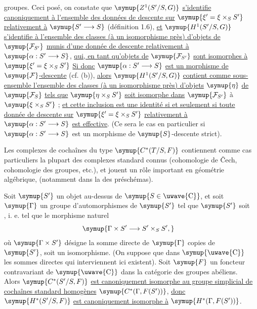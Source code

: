 groupes. Ceci posé, on constate que $\symup{Z^1(S'/S,G)}$ \uline{s'identifie
canoniquement à l'ensemble des données de descente sur}
$\symup{\xi'=\xi\times_SS'}$ \uline{relativement à} $\symup{S'\longrightarrow S}$ (définition 1.6),
\uline{et} $\symup{H^1(S'/S,G)}$ \uline{s'identifie à l'ensemble des classes (à un
isomorphisme près) d'objets de} $\symup{\mathcal F_{S'}}$ \uline{munis d'une donnée de descente
relativement à} $\symup{\alpha:S'\longrightarrow S}$, \uline{qui, en tant qu'objets de}
$\symup{\mathcal F_{S'}}$ \uline{sont isomorphes à} $\symup{\xi'=\xi\times_SS'}$ \uline{Si donc} $\symup{\alpha:S'\longrightarrow S}$ \uline{est un morphisme de} $\symup{\mathcal F}$\uline{-descente} (cf. (b)), \uline{alors} $\symup{H^1(S'/S,G)}$ \uline{contient comme sous-ensemble
l'ensemble des classes (à un isomorphisme près) d'objets} $\symup{\eta}$ \uline{de}
$\symup{\mathcal F_S}$ \uline{tels que} $\symup{\eta\times_SS'}$ \uline{soit isomorphe dans}
$\symup{\mathcal F_{S'}}$ à $\symup{\xi\times_SS'}$ ; \uline{et cette inclusion est une identité si
et seulement si toute donnée de descente sur} $\symup{\xi'=\xi\times_SS'}$
\uline{relativement à} $\symup{\alpha:S'\longrightarrow S}$ \uline{est effective}. (Ce sera le cas en
particulier si $\symup{\alpha:S'\longrightarrow S}$ est un morphisme de
$\symup{S}$-descente strict).

 Les complexes de cochaînes du type $\symup{C^*(T/S,F)}$ contiennent
comme cas particuliers la plupart des complexes standard connus (cohomologie
de Čech, cohomologie des groupes, etc.), et jouent un rôle important en
géométrie algébrique, (notamment dans la  des préschémas).

 Soit $\symup{S'}$ un objet au-dessus de $\symup{S\in\text{\uwave{C}}}$, et
soit $\symup{\Gamma}$ un groupe d'automorphismes de $\symup{S'}$ tel que $\symup{S'}$ soit
, i. e. tel que le
morphisme naturel
\[
  \symup{\Gamma\times S'\longrightarrow S'\times_SS',}
\]
où $\symup{\Gamma\times S'}$ désigne la somme directe de $\symup{\Gamma}$ copies de $\symup{S'}$, soit
un isomorphisme. (On suppose que dans $\symup{\text{\uwave{C}}}$ les sommes directes qui
interviennent ici existent). Soit $\symup{F}$ un foncteur contravariant de $\symup{\text{\uwave{C}}}$
dans la catégorie des groupes abéliens. Alors $\symup{C^*(S'/S,F)}$ \uline{est canoniquement
isomorphe au groupe simplicial de cochaînes standard homogènes}
$\symup{C^*(\Gamma,F(S'))}$, \uline{donc} $\symup{H^*(S'/S,F)}$ \uline{est canoniquement isomorphe à}
$\symup{H^*(\Gamma,F(S'))}$.

